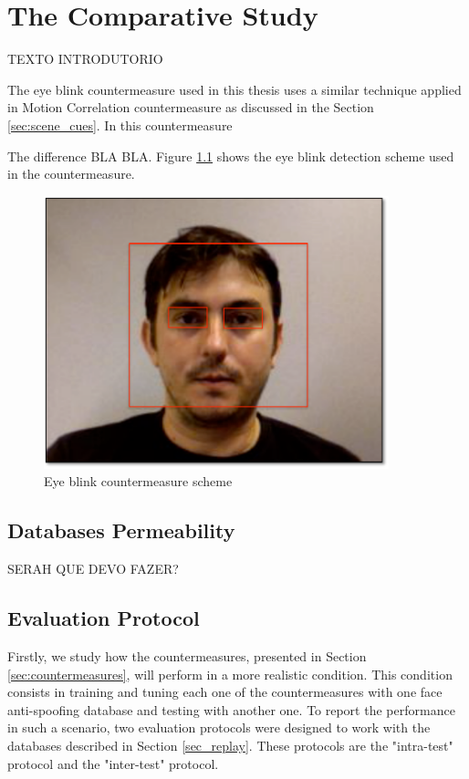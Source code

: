 \chapter{The Comparative Study}
\label{chap:Comparative_Study}

TEXTO INTRODUTORIO


The eye blink countermeasure used in this thesis uses a similar technique applied in Motion Correlation countermeasure\cite{AnjosIJCB2011} as discussed in the Section \ref{sec:scene_cues}. In this countermeasure 

The difference BLA BLA.
Figure \ref{fig:eye_blink} shows the eye blink detection scheme used in the countermeasure.

\begin{figure}[!btb]
\begin{center}
\includegraphics [width=10cm] {images/eye_blink.pdf}
\caption[Eye blink countermeasure scheme]{Eye blink countermeasure scheme}
\label{fig:eye_blink}
\end{center}
\end{figure}



\section{Databases Permeability}
\label{sec:Databases_Permeability}

SERAH QUE DEVO FAZER?

\section{Evaluation Protocol}
\label{sec:Evaluation_Protocol}

Firstly, we study how the countermeasures, presented in Section \ref{sec:countermeasures}, will perform in a more realistic condition. This condition consists in training and tuning each one of the countermeasures with one face anti-spoofing database and testing with another one. To report the performance in such a scenario, two evaluation protocols were designed to work with the databases described in Section \ref{sec_replay}. These protocols are the "intra-test" protocol and the "inter-test" protocol.


